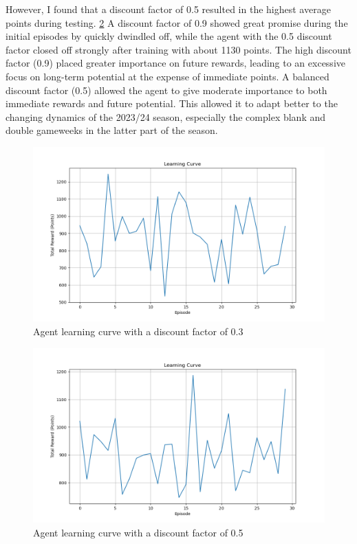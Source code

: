 However, I found that a discount factor of 0.5 resulted in the highest average points during testing. \ref{fig:learning_curve_0.5} A discount factor of 0.9 showed great promise during the initial episodes by quickly dwindled off, while the agent with the 0.5 discount factor closed off strongly after training with about 1130 points. The high discount factor (0.9) placed greater importance on future rewards, leading to an excessive focus on long-term potential at the expense of immediate points. A balanced discount factor (0.5) allowed the agent to give moderate importance to both immediate rewards and future potential. This allowed it to adapt better to the changing dynamics of the 2023/24 season, especially the complex blank and double gameweeks in the latter part of the season.

\begin{figure}[h]
    \centering
    \includegraphics[width=1.0\textwidth]{figs/learning_curve_0.3.png}
    \vskip 0.2in
    \caption{Agent learning curve with a discount factor of 0.3}
    \label{fig:learning_curve_0.3}
\end{figure}

\begin{figure}[h]
    \centering
    \includegraphics[width=1.0\textwidth]{figs/learning_curve_0.5.png}
    \vskip 0.2in
    \caption{Agent learning curve with a discount factor of 0.5}
    \label{fig:learning_curve_0.5}
\end{figure}

